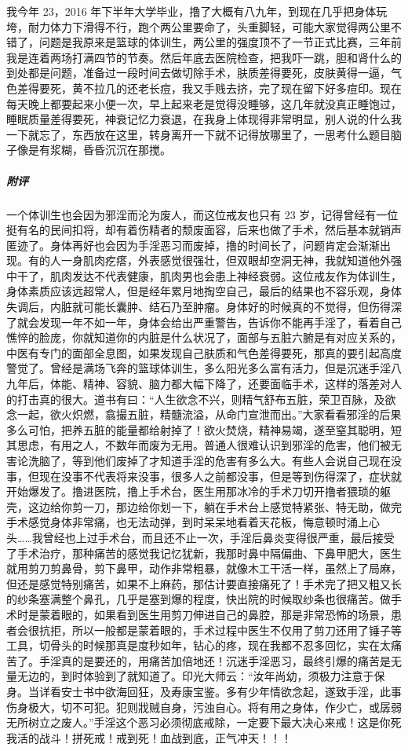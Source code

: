 \begin{case}
    我今年 23，2016 年下半年大学毕业，撸了大概有八九年，到现在几乎把身体玩垮，耐力体力下滑得不行，跑个两公里要命了，头重脚轻，可能大家觉得两公里不错了，问题是我原来是篮球的体训生，两公里的强度顶不了一节正式比赛，三年前我是连着两场打满四节的节奏。然后年底去医院检查，把我吓一跳，胆和肾什么的到处都是问题，准备过一段时间去做切除手术，肤质差得要死，皮肤黄得一逼，气色差得要死，黄不拉几的还老长痘，我又手贱去挤，完了现在留下好多痘印。现在每天晚上都要起来小便一次，早上起来老是觉得没睡够，这几年就没真正睡饱过，睡眠质量差得要死，神衰记忆力衰退，在我身上体现得非常明显，别人说的什么我一下就忘了，东西放在这里，转身离开一下就不记得放哪里了，一思考什么题目脑子像是有浆糊，昏昏沉沉在那搅。
    \subparagraph{附评} 一个体训生也会因为邪淫而沦为废人，而这位戒友也只有 23 岁，记得曾经有一位挺有名的民间扣将，却有着伤精者的颓废面容，后来也做了手术，然后基本就销声匿迹了。身体再好也会因为手淫恶习而废掉，撸的时间长了，问题肯定会渐渐出现。有的人一身肌肉疙瘩，外表感觉很强壮，但双眼却空洞无神，我就知道他外强中干了，肌肉发达不代表健康，肌肉男也会患上神经衰弱。这位戒友作为体训生，身体素质应该远超常人，但是经年累月地掏空自己，最后的结果也不容乐观，身体失调后，内脏就可能长囊肿、结石乃至肿瘤。身体好的时候真的不觉得，但伤得深了就会发现一年不如一年，身体会给出严重警告，告诉你不能再手淫了，看着自己憔悴的脸庞，你就知道你的内脏是什么状况了，面部与五脏六腑是有对应关系的，中医有专门的面部全息图，如果发现自己肤质和气色差得要死，那真的要引起高度警觉了。曾经是满场飞奔的篮球体训生，多么阳光多么富有活力，但是沉迷手淫八九年后，体能、精神、容貌、脑力都大幅下降了，还要面临手术，这样的落差对人的打击真的很大。道书有曰：“人生欲念不兴，则精气舒布五脏，荣卫百脉，及欲念一起，欲火炽燃，翕撮五脏，精髓流溢，从命门宣泄而出。”大家看看邪淫的后果多么可怕，把养五脏的能量都给射掉了！欲火焚烧，精神易竭，遂至窒其聪明，短其思虑，有用之人，不数年而废为无用。普通人很难认识到邪淫的危害，他们被无害论洗脑了，等到他们废掉了才知道手淫的危害有多么大。有些人会说自己现在没事，但现在没事不代表将来没事，很多人之前都没事，但是等到伤得深了，症状就开始爆发了。撸进医院，撸上手术台，医生用那冰冷的手术刀切开撸者猥琐的躯壳，这边给你剪一刀，那边给你划一下，躺在手术台上感觉特紧张、特无助，做完手术感觉身体非常痛，也无法动弹，到时呆呆地看着天花板，悔意顿时涌上心头……我曾经也上过手术台，而且还不止一次，手淫后鼻炎变得很严重，最后接受了手术治疗，那种痛苦的感觉我记忆犹新，我那时鼻中隔偏曲、下鼻甲肥大，医生就用剪刀剪鼻骨，剪下鼻甲，动作非常粗暴，就像木工干活一样，虽然上了局麻，但还是感觉特别痛苦，如果不上麻药，那估计要直接痛死了！手术完了把又粗又长的纱条塞满整个鼻孔，几乎是塞到爆的程度，快出院的时候取纱条也很痛苦。做手术时是蒙着眼的，如果看到医生用剪刀伸进自己的鼻腔，那是非常恐怖的场景，患者会很抗拒，所以一般都是蒙着眼的，手术过程中医生不仅用了剪刀还用了锤子等工具，切骨头的时候那真是度秒如年，钻心的疼，现在我都不忍多回忆，实在太痛苦了。手淫真的是要还的，用痛苦加倍地还！沉迷手淫恶习，最终引爆的痛苦是无量无边的，到时体验到了就知道了。印光大师云：“汝年尚幼，须极力注意于保身。当详看安士书中欲海回狂，及寿康宝鉴。多有少年情欲念起，遂致手淫，此事伤身极大，切不可犯。犯则戕贼自身，污浊自心。将有用之身体，作少亡，或孱弱无所树立之废人。”手淫这个恶习必须彻底戒除，一定要下最大决心来戒！这是你死我活的战斗！拼死戒！戒到死！血战到底，正气冲天！！！
\end{case}

